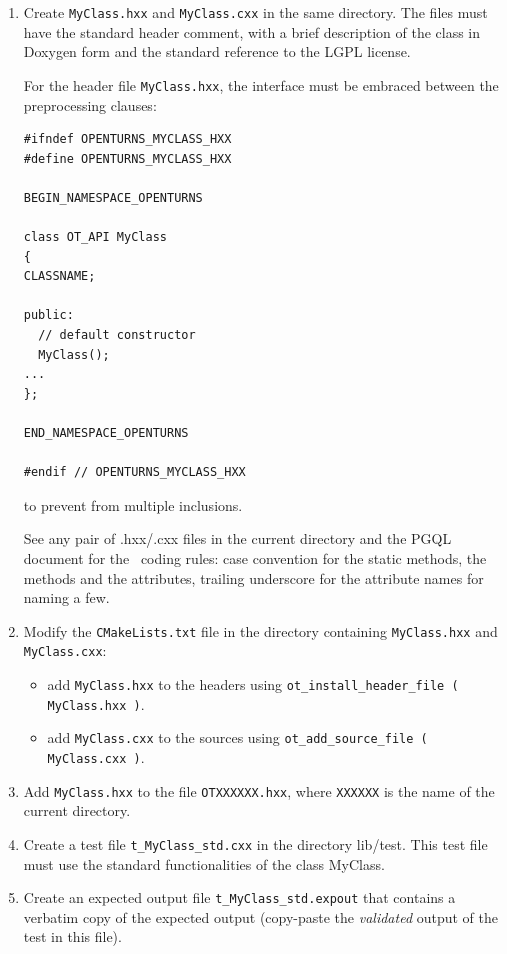 \begin{enumerate}
\item Create \verb!MyClass.hxx! and \verb!MyClass.cxx! in the same directory. The files must have the standard header comment, with a brief description of the class in Doxygen form and the standard reference to the LGPL license.

For the header file \verb!MyClass.hxx!, the interface must be embraced between the preprocessing clauses:

\begin{lstlisting}
#ifndef OPENTURNS_MYCLASS_HXX
#define OPENTURNS_MYCLASS_HXX

BEGIN_NAMESPACE_OPENTURNS

class OT_API MyClass
{
CLASSNAME;

public:
  // default constructor
  MyClass();
...
};

END_NAMESPACE_OPENTURNS

#endif // OPENTURNS_MYCLASS_HXX
\end{lstlisting}

to prevent from multiple inclusions.

See any pair of .hxx/.cxx files in the current directory and the PGQL document for the \OT\ coding rules: case convention for the static methods, the methods and the attributes, trailing underscore for the attribute names for naming a few.

\item Modify the \verb!CMakeLists.txt! file in the directory containing \verb!MyClass.hxx! and \verb!MyClass.cxx!:
\begin{itemize}
\item add \verb!MyClass.hxx! to the headers using \verb!ot_install_header_file ( MyClass.hxx )!.
\item add \verb!MyClass.cxx! to the sources using \verb!ot_add_source_file ( MyClass.cxx )!.
\end{itemize}

\item Add \verb!MyClass.hxx! to the file \verb!OTXXXXXX.hxx!, where \verb!XXXXXX! is the name of the current directory.

\item Create a test file \verb!t_MyClass_std.cxx! in the directory lib/test. This test file must use the standard functionalities of the class MyClass.

\item Create an expected output file \verb!t_MyClass_std.expout! that contains a verbatim copy of the expected output (copy-paste the \emph{validated} output of the test in this file).


\end{enumerate}
